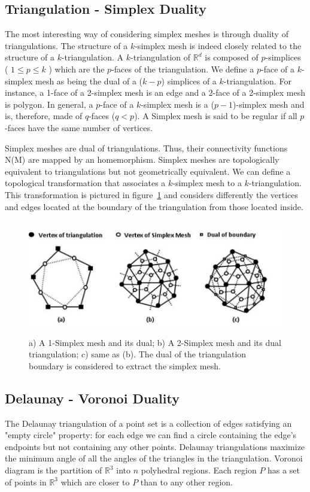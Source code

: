 \documentclass{InsightArticle}
\begin{document}
\subsection{Triangulation - Simplex Duality}
The most interesting way of considering simplex meshes is through duality of triangulations. The structure of a $k$-simplex mesh is indeed closely related to the structure of a $k$-triangulation. A $k$-triangulation of $\mathbb{R}^d$ is composed of $p$-simplices ( $1 \leq p \leq k$ ) which are the $p$-faces of the triangulation. We define a $p$-face of a $k$-simplex mesh as being the dual of a ($k-p$) simplices of a $k$-triangulation. For instance, a 1-face of a 2-simplex mesh is an edge and a 2-face of a 2-simplex mesh is polygon. In general, a $p$-face of a $k$-simplex mesh is a ($p-1$)-simplex mesh and is, therefore, made of $q$-faces ($q < p$). A Simplex mesh is said to be regular if all $p$-faces have the same number of vertices.

Simplex meshes are dual of triangulations. Thus, their connectivity functions N(M) are mapped by an homemorphism. Simplex meshes are topologically equivalent to triangulations but not geometrically equivalent. We can define a topological transformation that associates a $k$-simplex mesh to a $k$-triangulation. This transformation is pictured in figure~\ref{fig:simplexMeshes} and considers differently the vertices and edges located at the boundary of the triangulation from those located inside. 
\begin{figure}
	\centering
	\includegraphics[width=150mm, height=50mm]{SimplexMesh_Examples}
	\caption{a) A 1-Simplex mesh and its dual; b) A 2-Simplex mesh and its dual triangulation; c) same as (b). The dual of the triangulation boundary is considered to extract the simplex mesh.}
	\label{fig:simplexMeshes}
\end{figure}
\subsection{Delaunay - Voronoi Duality}
The Delaunay triangulation of a point set is a collection of edges satisfying an "empty circle" property: for each edge we can find a circle containing the edge's endpoints but not containing any other points. Delaunay triangulations maximize the minimum angle of all the angles of the triangles in the triangulation. Voronoi diagram is the partition of $\mathbb{R}^3$ into $n$ polyhedral regions. Each region $P$ has a set of points in $\mathbb{R}^3$ which are closer to $P$ than to any other region.
\end{document}
